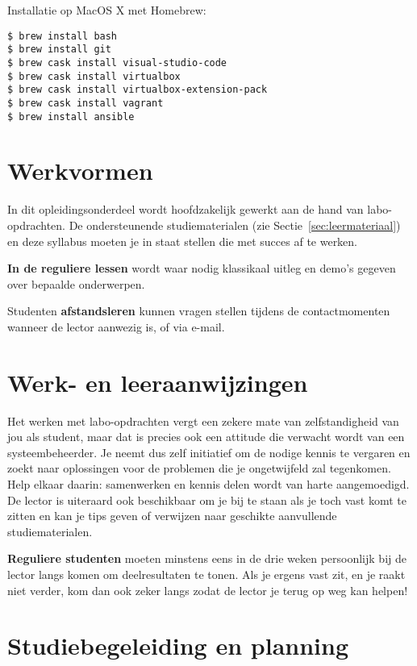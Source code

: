 Installatie op MacOS X met Homebrew:

\begin{verbatim}
$ brew install bash
$ brew install git
$ brew cask install visual-studio-code
$ brew cask install virtualbox
$ brew cask install virtualbox-extension-pack
$ brew cask install vagrant
$ brew install ansible
\end{verbatim}

\section{Werkvormen}%
\label{sec:werkvormen}

In dit opleidingsonderdeel wordt hoofdzakelijk gewerkt aan de hand van labo-op\-drach\-ten. De ondersteunende studiematerialen (zie Sectie~\ref{sec:leermateriaal}) en deze syllabus moeten je in staat stellen die met succes af te werken.

\textbf{In de reguliere lessen} wordt waar nodig klassikaal uitleg en demo's gegeven over bepaalde onderwerpen.

Studenten \textbf{afstandsleren} kunnen vragen stellen tijdens de contactmomenten wanneer de lector aanwezig is, of via e-mail.

\section{Werk- en leeraanwijzingen}%
\label{sec:werk-en-leeraanwijzingen}

Het werken met labo-opdrachten vergt een zekere mate van zelfstandigheid van jou als student, maar dat is precies ook een attitude die verwacht wordt van een systeembeheerder. Je neemt dus zelf initiatief om de nodige kennis te vergaren en zoekt naar oplossingen voor de problemen die je ongetwijfeld zal tegenkomen. Help elkaar daarin: samenwerken en kennis delen wordt van harte aangemoedigd. De lector is uiteraard ook beschikbaar om je bij te staan als je toch vast komt te zitten en kan je tips geven of verwijzen naar geschikte aanvullende studiematerialen.

\textbf{Reguliere studenten} moeten minstens eens in de drie weken persoonlijk bij de lector langs komen om deelresultaten te tonen. Als je ergens vast zit, en je raakt niet verder, kom dan ook zeker langs zodat de lector je terug op weg kan helpen!

\section{Studiebegeleiding en planning}%
\label{sec:studiebegeleiding-en-planning}

